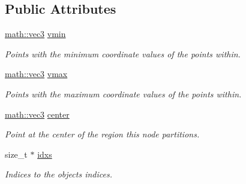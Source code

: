 \subsection*{Public Attributes}
\begin{DoxyCompactItemize}
\item 
\mbox{\label{structphysim_1_1structures_1_1octree_1_1node_a613c0a9c31c695326c8e93960fef02c0}} 
\hyperlink{structphysim_1_1math_1_1vec3}{math\+::vec3} \hyperlink{structphysim_1_1structures_1_1octree_1_1node_a613c0a9c31c695326c8e93960fef02c0}{vmin}
\begin{DoxyCompactList}\small\item\em Points with the minimum coordinate values of the points within. \end{DoxyCompactList}\item 
\mbox{\label{structphysim_1_1structures_1_1octree_1_1node_a24c7a2173e6a9fe1b90af08515f442a6}} 
\hyperlink{structphysim_1_1math_1_1vec3}{math\+::vec3} \hyperlink{structphysim_1_1structures_1_1octree_1_1node_a24c7a2173e6a9fe1b90af08515f442a6}{vmax}
\begin{DoxyCompactList}\small\item\em Points with the maximum coordinate values of the points within. \end{DoxyCompactList}\item 
\mbox{\label{structphysim_1_1structures_1_1octree_1_1node_affc727be57e0ed71aba4fa7abc61825a}} 
\hyperlink{structphysim_1_1math_1_1vec3}{math\+::vec3} \hyperlink{structphysim_1_1structures_1_1octree_1_1node_affc727be57e0ed71aba4fa7abc61825a}{center}
\begin{DoxyCompactList}\small\item\em Point at the center of the region this node partitions. \end{DoxyCompactList}\item 
\mbox{\label{structphysim_1_1structures_1_1octree_1_1node_ae365c35e35e5953164597fdb4264ab87}} 
size\+\_\+t $\ast$ \hyperlink{structphysim_1_1structures_1_1octree_1_1node_ae365c35e35e5953164597fdb4264ab87}{idxs}
\begin{DoxyCompactList}\small\item\em Indices to the objects\textquotesingle{} indices. \end{DoxyCompactList}\item 

\end{DoxyCompactItemize}
